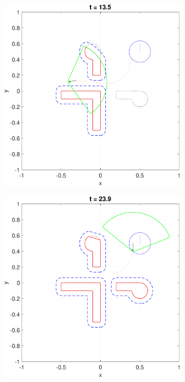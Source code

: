 \begin{figure}
  \begin{subfigure}[t]{0.49\columnwidth}
    \includegraphics[width=\columnwidth]{fig/P5D_Dubins/136}
  \end{subfigure}
  \begin{subfigure}[t]{0.49\columnwidth}
    \includegraphics[width=\columnwidth]{fig/P5D_Dubins/240}

\end{subfigure}
\end{figure}
